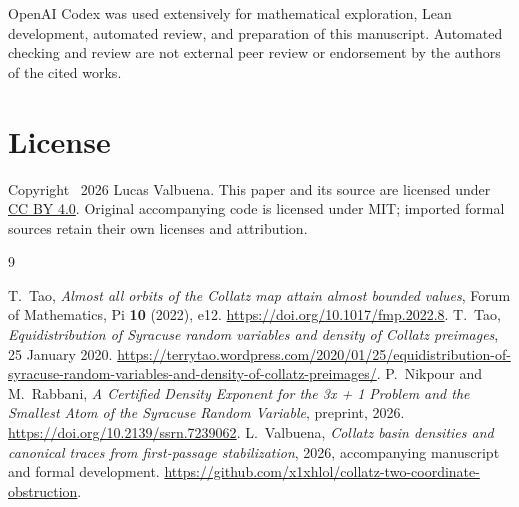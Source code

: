 \documentclass[11pt]{article}
\theoremstyle{remark}
\begin{document}
OpenAI Codex was used extensively for mathematical exploration,
Lean development, automated review, and preparation of this manuscript.
Automated checking and review are not external peer review or
endorsement by the authors of the cited works.

\section*{License}
Copyright \textcopyright\ 2026 Lucas Valbuena.
This paper and its source are licensed under
\href{https://creativecommons.org/licenses/by/4.0/}{CC BY 4.0}.
Original accompanying code is licensed under MIT; imported formal
sources retain their own licenses and attribution.

\begin{thebibliography}{9}\small\raggedright
{} T.~Tao,
\emph{Almost all orbits of the Collatz map attain almost bounded values},
Forum of Mathematics, Pi \textbf{10} (2022), e12.
\url{https://doi.org/10.1017/fmp.2022.8}.
 T.~Tao,
\emph{Equidistribution of Syracuse random variables and density of
Collatz preimages}, 25 January 2020.
\url{https://terrytao.wordpress.com/2020/01/25/equidistribution-of-syracuse-random-variables-and-density-of-collatz-preimages/}.
 P.~Nikpour and M.~Rabbani,
\emph{A Certified Density Exponent for the 3x + 1 Problem and the
Smallest Atom of the Syracuse Random Variable}, preprint, 2026.
\url{https://doi.org/10.2139/ssrn.7239062}.
 L.~Valbuena,
\emph{Collatz basin densities and canonical traces from first-passage
stabilization}, 2026, accompanying manuscript and formal development.
\url{https://github.com/x1xhlol/collatz-two-coordinate-obstruction}.
\end{thebibliography}
\end{document}
